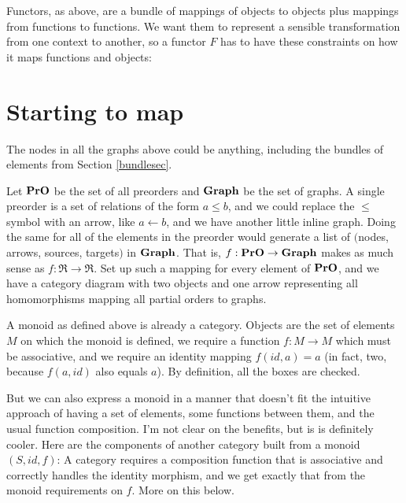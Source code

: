 \documentclass[11pt]{article}
\begin{document}
Functors, as above, are a bundle of mappings of objects to objects plus mappings from
functions to functions.  We want them to represent a sensible transformation from one
context to another, so a functor $F$ has to have these constraints on how it maps
functions and objects:

\section{Starting to map}
The nodes in all the graphs above could be anything, including the bundles of elements from
Section \ref{bundlesec}.

Let ${\bf PrO}$ be the set of all preorders and ${\bf Graph}$ be the set of graphs. A
single preorder is a set of relations of the form $a \leq b$, and we could replace the $\leq$
symbol with an arrow, like $a\leftarrow b$, and we have another little inline graph. 
Doing the same for all of the elements in the preorder would generate a list of
$($nodes, arrows, sources, targets$)$ in ${\bf Graph}$.
That is, $f:{\bf PrO}\to {\bf Graph}$ makes as much sense as $f:\Re \to \Re$. Set up such
a mapping for every element of ${\bf PrO}$, and we have a category diagram with two
objects and one arrow representing all homomorphisms mapping all partial orders to graphs.

A monoid as defined above is already a category. Objects are the set of elements $M$
on which the monoid is defined, we require a function $f:M\to M$ which must be
associative, and we require an identity mapping $f(id, a)= a$ (in fact, two, because
$f(a, id)$ also equals $a$). By definition, all the boxes are checked.

But we can also express a monoid in a manner that doesn't fit the intuitive approach
of having a set of elements, some functions between them, and the usual function
composition. I'm not clear on the benefits, but is is definitely cooler. Here are the
components of another category built from a monoid $(S, id, f)$:
A category requires a composition function that is associative and correctly handles the
identity morphism, and we get exactly that from the monoid requirements on $f$. More on
this below.
\end{document}
